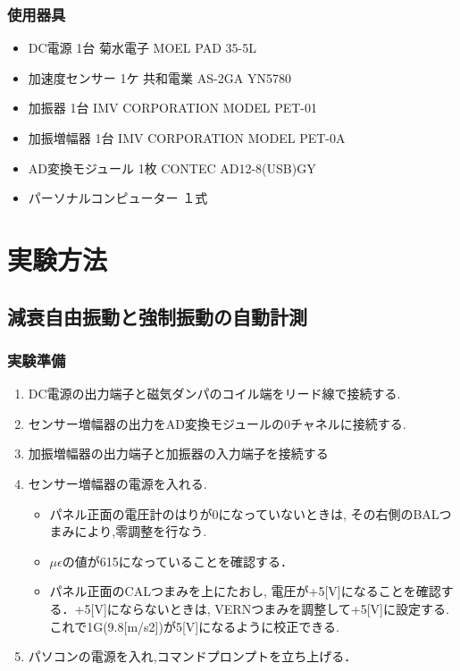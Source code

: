 \documentclass[a4paper,10.5pt]{jsarticle}
\begin{document}
\subsubsection{使用器具}
\begin{itemize}
  \item DC電源  1台  菊水電子  MOEL PAD 35-5L
  \item 加速度センサー  1ケ  共和電業  AS-2GA YN5780
  \item 加振器  1台  IMV CORPORATION  MODEL PET-01
  \item 加振増幅器  1台  IMV CORPORATION  MODEL PET-0A
  \item AD変換モジュール  1枚  CONTEC  AD12-8(USB)GY
  \item パーソナルコンピューター  １式
\end{itemize}

\section{実験方法}
\subsection{減衰自由振動と強制振動の自動計測}
\subsubsection{実験準備}
\begin{enumerate}
  \item DC電源の出力端子と磁気ダンパのコイル端をリード線で接続する.
  \item センサー増幅器の出力をAD変換モジュールの0チャネルに接続する.
  \item 加振増幅器の出力端子と加振器の入力端子を接続する
  \item センサー増幅器の電源を入れる.
  \begin{itemize}
    \item パネル正面の電圧計のはりが0になっていないときは,
    その右側のBALつまみにより,零調整を行なう.
    \item $μ\epsilon$の値が615になっていることを確認する．
    \item パネル正面のCALつまみを上にたおし,
    電圧が+5[V]になることを確認する．+5[V]にならないときは,
    VERNつまみを調整して+5[V]に設定する.
    これで1G(9.8[m/s2])が5[V]になるように校正できる.
  \end{itemize}
  \item パソコンの電源を入れ,コマンドプロンプトを立ち上げる．
\end{enumerate}
\end{document}
